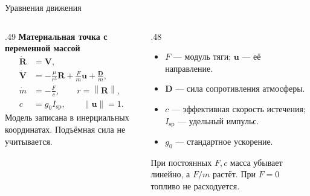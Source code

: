 \documentclass[11pt,aspectratio=169,t]{beamer}
\newcommand{\eqcompact}{\fontsize{10}{12}\selectfont}
\newcommand{\derivationmathspacing}{%
  \setlength{\abovedisplayskip}{2pt}%
  \setlength{\belowdisplayskip}{3pt}%
  \setlength{\abovedisplayshortskip}{2pt}%
  \setlength{\belowdisplayshortskip}{2pt}%
  \setlength{\jot}{2pt}}
\newcommand{\vect}[1]{\boldsymbol{#1}}
\newcommand{\norm}[1]{\left\lVert#1\right\rVert}
\begin{document}
\begin{frame}{Уравнения движения}
\relax\derivationmathspacing
\begin{columns}[T,onlytextwidth]
\begin{column}{.49\textwidth}
\textbf{Материальная точка с переменной массой}
{\eqcompact
\[
\begin{aligned}
 \dot{\vect R}&=\vect V,\\[2pt]
 \dot{\vect V}&=-\frac{\mu}{r^3}\vect R
                  +\frac Fm\vect u+\frac{\vect D}{m},\\[2pt]
 \dot m&=-\frac Fc,\qquad r=\norm{\vect R},\\
 c&=g_0I_{\mathrm{sp}},\qquad\norm{\vect u}=1.
\end{aligned}
\]
}
Модель записана в инерциальных координатах.
Подъёмная сила не учитывается.
\end{column}
\begin{column}{.48\textwidth}
\begin{itemize}
\setlength{\itemsep}{3pt}
 \item $F$ --- модуль тяги; $\vect u$ --- её направление.
 \item $\vect D$ --- сила сопротивления атмосферы.
 \item $c$ --- эффективная скорость истечения; $I_{\mathrm{sp}}$ --- удельный импульс.
 \item $g_0$ --- стандартное ускорение.
\end{itemize}
\smallskip
При постоянных $F,c$ масса убывает линейно, а $F/m$ растёт.
При $F=0$ топливо не расходуется.
\end{column}
\end{columns}
\end{frame}
\end{document}
